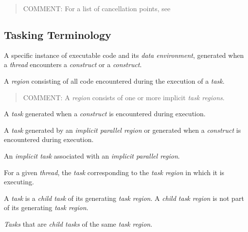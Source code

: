 \begin{quote}
COMMENT: For a list of cancellation points, see 
\end{quote}
\glossarydefend
\bigskip







\subsection{Tasking Terminology}
\label{subsec:Tasking Terminology}
\glossarydefstart
A specific instance of executable code and its \emph{data environment}, generated when a 
\emph{thread} encounters a  \emph{construct} or a  \emph{construct}. 
\glossarydefend

\glossarydefstart
A \emph{region} consisting of all code encountered during the execution of a \emph{task}. 

\begin{quote}
COMMENT: A  \emph{region} consists of one or more implicit \emph{task regions}. 
\end{quote}
\glossarydefend

\glossarydefstart
A \emph{task} generated when a  \emph{construct} is encountered during execution.
\glossarydefend

\glossarydefstart
A \emph{task} generated by an \emph{implicit parallel region} or generated when a 
\emph{construct} is encountered during execution.
\glossarydefend

\glossarydefstart
An \emph{implicit task} associated with an \emph{implicit parallel region}.
\glossarydefend

\glossarydefstart
For a given \emph{thread}, the \emph{task} corresponding to the \emph{task region} in which it is 
executing.
\glossarydefend

\glossarydefstart
A \emph{task} is a \emph{child task} of its generating \emph{task region}. 
A \emph{child task region} is not part of its generating \emph{task region}.
\glossarydefend

\glossarydefstart
\emph{Tasks} that are \emph{child tasks} of the same \emph{task region}.
\glossarydefend

